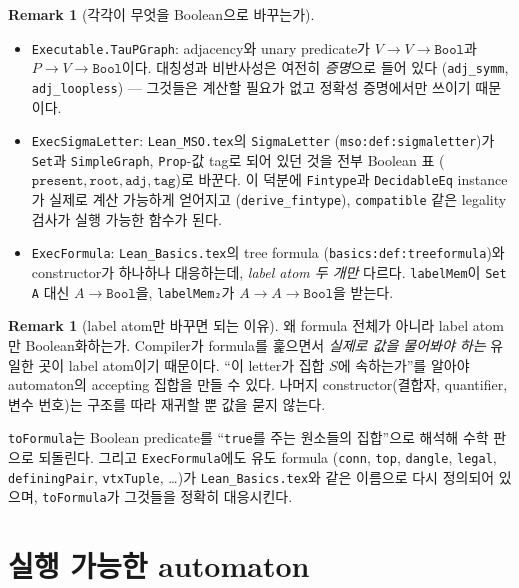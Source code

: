 \documentclass[11pt]{article}
\theoremstyle{definition}
\newtheorem{remark}[definition]{Remark}
\theoremstyle{plain}
\newcommand{\lean}[1]{\texttt{#1}}
\newcommand{\leanfile}[1]{\texttt{#1}}
\begin{document}
\begin{remark}[각각이 무엇을 Boolean으로 바꾸는가]
\label{alg:rem:whatbecomesbool}
\begin{itemize}
  \item \lean{Executable.TauPGraph}: adjacency와 unary predicate가
    $V \to V \to \lean{Bool}$과 $P \to V \to \lean{Bool}$이다. 대칭성과
    비반사성은 여전히 \emph{증명}으로 들어 있다 (\lean{adj\_symm},
    \lean{adj\_loopless}) --- 그것들은 계산할 필요가 없고 정확성 증명에서만
    쓰이기 때문이다.
  \item \lean{ExecSigmaLetter}: \leanfile{Lean\_MSO.tex}의 \lean{SigmaLetter}
    (\lean{mso:def:sigmaletter})가 \lean{Set}과 \lean{SimpleGraph},
    \lean{Prop}-값 tag로 되어 있던 것을 전부 Boolean 표
    ($\lean{present}, \lean{root}, \lean{adj}, \lean{tag}$)로 바꾼다.
    이 덕분에 \lean{Fintype}과 \lean{DecidableEq} instance가 실제로 계산
    가능하게 얻어지고 (\lean{derive\_fintype}), \lean{compatible} 같은
    legality 검사가 실행 가능한 함수가 된다.
  \item \lean{ExecFormula}: \leanfile{Lean\_Basics.tex}의 tree formula
    (\lean{basics:def:treeformula})와 constructor가 하나하나 대응하는데,
    \emph{label atom 두 개만} 다르다. \lean{labelMem}이 \lean{Set A} 대신
    $A \to \lean{Bool}$을, \lean{labelMem₂}가 $A \to A \to \lean{Bool}$을
    받는다.
\end{itemize}
\end{remark}

\begin{remark}[label atom만 바꾸면 되는 이유]
\label{alg:rem:onlylabelatoms}
왜 formula 전체가 아니라 label atom만 Boolean화하는가. Compiler가
formula를 훑으면서 \emph{실제로 값을 물어봐야 하는} 유일한 곳이 label atom이기
때문이다. ``이 letter가 집합 $S$에 속하는가''를 알아야 automaton의 accepting
집합을 만들 수 있다. 나머지 constructor(결합자, quantifier, 변수 번호)는
구조를 따라 재귀할 뿐 값을 묻지 않는다.

\lean{toFormula}는 Boolean predicate를 ``\lean{true}를 주는 원소들의 집합''으로
해석해 수학 판으로 되돌린다. 그리고 \lean{ExecFormula}에도 유도 formula
(\lean{conn}, \lean{top}, \lean{dangle}, \lean{legal}, \lean{definingPair},
\lean{vtxTuple}, \dots)가 \leanfile{Lean\_Basics.tex}와 같은 이름으로 다시
정의되어 있으며, \lean{toFormula}가 그것들을 정확히 대응시킨다.
\end{remark}

\section{실행 가능한 automaton}
\label{alg:sec:execautomaton}
\end{document}
